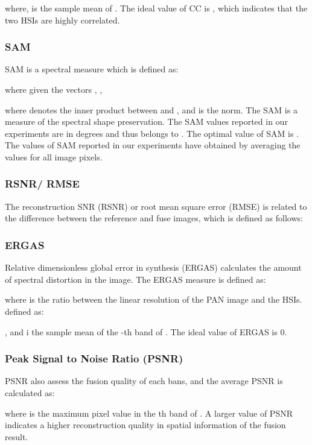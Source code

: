\documentclass[journal]{IEEEtran}
\begin{document}
    where,  is the sample mean of . The ideal value of CC is , which indicates that the two HSIs are highly correlated.
    
\subsubsection{SAM}  SAM is a spectral measure which is defined as:
    
    where given the vectors , ,
    
    where  denotes the inner product between  and , and  is the  norm. The SAM is a measure of the spectral shape preservation. The SAM values reported in our experiments are in degrees and thus belongs to . The optimal value of SAM is . The values of SAM reported in our experiments have obtained by averaging the values for all image pixels.
    
\subsubsection{RSNR/ RMSE} The reconstruction SNR (RSNR) or root mean square error (RMSE) is related to the difference between the reference and fuse images, which is defined as follows:
    
    
    
\subsubsection{ERGAS} Relative dimensionless global error in synthesis (ERGAS) calculates the amount of spectral distortion in the image. The ERGAS measure is defined as:
    
    where  is the ratio between the linear resolution of the PAN image and the HSIs. defined as:
    
    , and  i the sample mean of the -th band of . The ideal value of ERGAS is 0.
    
\subsubsection{Peak Signal to Noise Ratio (PSNR)} PSNR also assess the fusion quality of each bans, and the average PSNR is calculated as:
    
    where  is the maximum pixel value in the th band of . A larger value of PSNR indicates a higher reconstruction quality in spatial information of the fusion result.
\end{document}
